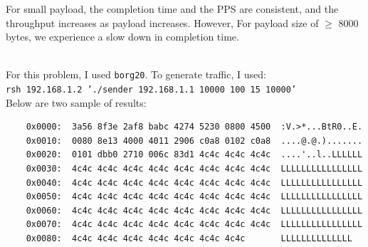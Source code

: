 \documentclass[12pt]{article}
\newenvironment{problem}[2][Problem]{\begin{trivlist}
\item[\hskip \labelsep {\bfseries #1}\hskip \labelsep {\bfseries #2.}]}{\end{trivlist}}
\begin{document}
\begin{problem}{2}
\begin{center}
\end{center}
For small payload, the completion time and the PPS are consistent, and the throughput increases as payload increases. However, For payload size of $\geq$ 8000 bytes, we experience a slow down in completion time.
\end{problem}
\begin{problem}{3} \ \\
For this problem, I used \texttt{borg20}.
To generate traffic, I used: \\
\texttt{rsh 192.168.1.2 './sender 192.168.1.1 10000 100 15 10000'}
\\
Below are two sample of results:
\begin{verbatim}
	0x0000:  3a56 8f3e 2af8 babc 4274 5230 0800 4500  :V.>*...BtR0..E.
	0x0010:  0080 8e13 4000 4011 2906 c0a8 0102 c0a8  ....@.@.).......
	0x0020:  0101 dbb0 2710 006c 83d1 4c4c 4c4c 4c4c  ....'..l..LLLLLL
	0x0030:  4c4c 4c4c 4c4c 4c4c 4c4c 4c4c 4c4c 4c4c  LLLLLLLLLLLLLLLL
	0x0040:  4c4c 4c4c 4c4c 4c4c 4c4c 4c4c 4c4c 4c4c  LLLLLLLLLLLLLLLL
	0x0050:  4c4c 4c4c 4c4c 4c4c 4c4c 4c4c 4c4c 4c4c  LLLLLLLLLLLLLLLL
	0x0060:  4c4c 4c4c 4c4c 4c4c 4c4c 4c4c 4c4c 4c4c  LLLLLLLLLLLLLLLL
	0x0070:  4c4c 4c4c 4c4c 4c4c 4c4c 4c4c 4c4c 4c4c  LLLLLLLLLLLLLLLL
	0x0080:  4c4c 4c4c 4c4c 4c4c 4c4c 4c4c 4c4c       LLLLLLLLLLLLLL
\end{verbatim}


\end{problem}
\end{document}
